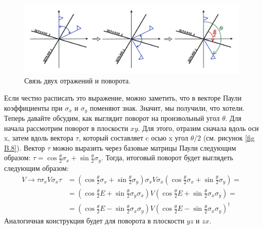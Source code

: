 \begin{figure}[!ht]
\centering
\includegraphics[scale=0.3]{appendix/images/reflections and turn.png}
\caption{Связь двух отражений и поворота.}
\label{fig B.7}
\end{figure}

Если честно расписать это выражение, можно заметить, что в векторе Паули коэффициенты при $\sigma_x$ и $\sigma_y$ поменяют знак. Значит, мы получили, что хотели. Теперь давайте обсудим, как выглядит поворот на произвольный угол $\theta$. Для начала рассмотрим поворот в плоскости $xy$. Для этого, отразим сначала вдоль оси x, затем вдоль вектора $\tau$, который составляет c осью x угол $\theta/2$ (см. рисунок \ref{fig B.8}). Вектор $\tau$ можно выразить через базовые матрицы Паули следующим образом: $\tau = \cos\frac{\theta}{2}\sigma_x + \sin\frac{\theta}{2}\sigma_y$. Тогда, итоговый поворот будет выглядеть следующим образом:
\begin{align*}
    V \rightarrow \tau \sigma_x V \sigma_x \tau &= \left(\cos\frac{\theta}{2}\sigma_x + \sin\frac{\theta}{2}\sigma_y\right)\sigma_x V \sigma_x \left(\cos\frac{\theta}{2}\sigma_x + \sin\frac{\theta}{2}\sigma_y\right) = \\
    & = \left(\cos\frac{\theta}{2}E + \sin\frac{\theta}{2}\sigma_y\sigma_x\right)V\left(\cos\frac{\theta}{2}E + \sin\frac{\theta}{2}\sigma_x\sigma_y\right) = \\
    & = \left(\cos\frac{\theta}{2}E - \sin\frac{\theta}{2}\sigma_x\sigma_y\right)V\left(\cos\frac{\theta}{2}E - \sin\frac{\theta}{2}\sigma_x\sigma_y\right)^{\dagger}
\end{align*}
Аналогичная конструкция будет для поворота в плоскости $yz$ и $zx$.
